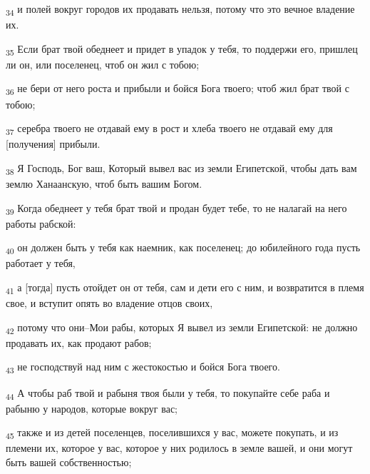 \begin{tcolorbox}
\textsubscript{34} и полей вокруг городов их продавать нельзя, потому что это вечное владение их.
\end{tcolorbox}
\begin{tcolorbox}
\textsubscript{35} Если брат твой обеднеет и придет в упадок у тебя, то поддержи его, пришлец ли он, или поселенец, чтоб он жил с тобою;
\end{tcolorbox}
\begin{tcolorbox}
\textsubscript{36} не бери от него роста и прибыли и бойся Бога твоего; чтоб жил брат твой с тобою;
\end{tcolorbox}
\begin{tcolorbox}
\textsubscript{37} серебра твоего не отдавай ему в рост и хлеба твоего не отдавай ему для [получения] прибыли.
\end{tcolorbox}
\begin{tcolorbox}
\textsubscript{38} Я Господь, Бог ваш, Который вывел вас из земли Египетской, чтобы дать вам землю Ханаанскую, чтоб быть вашим Богом.
\end{tcolorbox}
\begin{tcolorbox}
\textsubscript{39} Когда обеднеет у тебя брат твой и продан будет тебе, то не налагай на него работы рабской:
\end{tcolorbox}
\begin{tcolorbox}
\textsubscript{40} он должен быть у тебя как наемник, как поселенец; до юбилейного года пусть работает у тебя,
\end{tcolorbox}
\begin{tcolorbox}
\textsubscript{41} а [тогда] пусть отойдет он от тебя, сам и дети его с ним, и возвратится в племя свое, и вступит опять во владение отцов своих,
\end{tcolorbox}
\begin{tcolorbox}
\textsubscript{42} потому что они--Мои рабы, которых Я вывел из земли Египетской: не должно продавать их, как продают рабов;
\end{tcolorbox}
\begin{tcolorbox}
\textsubscript{43} не господствуй над ним с жестокостью и бойся Бога твоего.
\end{tcolorbox}
\begin{tcolorbox}
\textsubscript{44} А чтобы раб твой и рабыня твоя были у тебя, то покупайте себе раба и рабыню у народов, которые вокруг вас;
\end{tcolorbox}
\begin{tcolorbox}
\textsubscript{45} также и из детей поселенцев, поселившихся у вас, можете покупать, и из племени их, которое у вас, которое у них родилось в земле вашей, и они могут быть вашей собственностью;
\end{tcolorbox}
